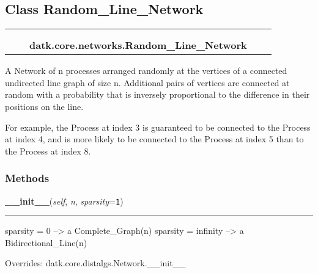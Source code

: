 
\subsection{Class Random\_Line\_Network}

    \label{datk:core:networks:Random_Line_Network}
\begin{tabular}{cccccc}
\multicolumn{2}{r}{\settowidth{\BCL}{datk.core.distalgs.Network}\multirow{2}{\BCL}{datk.core.distalgs.Network}}
&&
  \\\cline{3-3}
  &&\multicolumn{1}{c|}{}
&&
  \\
&&\multicolumn{2}{l}{\textbf{datk.core.networks.Random\_Line\_Network}}
\end{tabular}

A Network of n processes arranged randomly at the vertices of a connected 
undirected line graph of size n. Additional pairs of vertices are connected
at random with a probability that is inversely proportional to the 
difference in their positions on the line.

For example, the Process at index 3 is guaranteed to be connected to the 
Process at index 4, and is more likely to be connected to the Process at 
index 5 than to the Process at index 8.



  \subsubsection{Methods}

    \vspace{0.5ex}

\hspace{.8\funcindent}\begin{boxedminipage}{\funcwidth}

    \raggedright \textbf{\_\_init\_\_}(\textit{self}, \textit{n}, \textit{sparsity}={\tt 1})

    \vspace{-1.5ex}

    \rule{\textwidth}{0.5\fboxrule}
\setlength{\parskip}{2ex}
    sparsity = 0 --{\textgreater} a Complete\_Graph(n) sparsity = infinity 
    --{\textgreater} a Bidirectional\_Line(n)

\setlength{\parskip}{1ex}
      Overrides: datk.core.distalgs.Network.\_\_init\_\_

    \end{boxedminipage}


